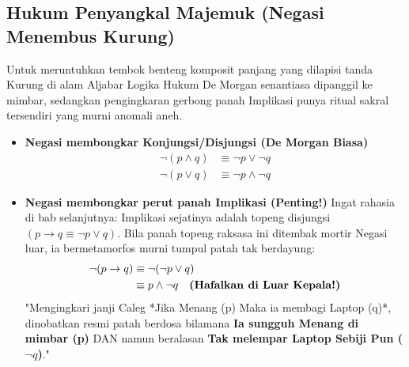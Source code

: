 \subsection{Hukum Penyangkal Majemuk (Negasi Menembus Kurung)}

Untuk meruntuhkan tembok benteng komposit panjang yang dilapisi tanda Kurung di alam Aljabar Logika Hukum De Morgan senantiasa dipanggil ke mimbar, sedangkan pengingkaran gerbong panah Implikasi punya ritual sakral tersendiri yang murni anomali aneh.

\begin{itemize}
    \item \textbf{Negasi membongkar Konjungsi/Disjungsi (De Morgan Biasa)}
    \begin{align*}
        \neg(p \wedge q) &\equiv \neg p \vee \neg q \\
        \neg(p \vee q) &\equiv \neg p \wedge \neg q
    \end{align*}
    
    \item \textbf{Negasi membongkar perut panah Implikasi (Penting!)}
    Ingat rahasia di bab selanjutnya: Implikasi sejatinya adalah topeng disjungsi $(p \rightarrow q \equiv \neg p \lor q)$. Bila panah topeng raksasa ini ditembak mortir Negasi luar, ia bermetamorfos murni tumpul patah tak berdayung:
    \begin{align*}
        \neg(p \rightarrow q) &\equiv \neg(\neg p \vee q) \\
                              &\equiv p \wedge \neg q \quad \text{\textbf{(Hafalkan di Luar Kepala!)}}
    \end{align*}
    "Mengingkari janji Caleg *Jika Menang (p) Maka ia membagi Laptop (q)*, dinobatkan resmi patah berdosa bilamana \textbf{Ia sungguh Menang di mimbar (p)} DAN namun beralasan \textbf{Tak melempar Laptop Sebiji Pun ($\neg q$)}."
\end{itemize}
